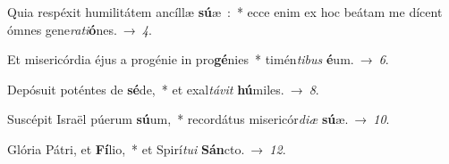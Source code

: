 ﻿\item Quia respéxit humilitátem ancíllæ \textbf{sú}æ~:~*
ecce enim ex hoc beátam me dícent ómnes gene\emph{ra}\emph{ti}\textbf{ó}nes.~→~\emph{4}.
\item Et misericórdia éjus a progénie in pro\textbf{gé}nies~*
timén\emph{ti}\-\emph{bus} \textbf{é}um.~→~\emph{6}.
\item Depósuit poténtes de \textbf{sé}de,~*
et exal\emph{tá}\-\emph{vit} \textbf{hú}miles.~→~\emph{8}.
\item Suscépit Israël púerum \textbf{sú}um,~*
recordátus misericór\emph{di}\-\emph{æ} \textbf{sú}æ.~→~\emph{10}.
\item Glória Pátri, et \textbf{Fí}lio,~*
et Spirí\emph{tu}\-\emph{i} \textbf{Sán}cto.~→~\emph{12}.
